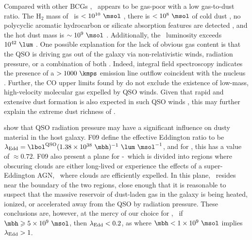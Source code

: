 \documentclass[useAMS,usenatbib]{mn2e}
\begin{document}
Compared with other BCGs \citep[\eg][]{edge01}, \irs\ appears to be
gas-poor with a low gas-to-dust ratio. The H$_2$ mass of \irs\ is $<
10^{10} ~\msol$ \citep{1998ApJ...506..205E}, there is $< 10^8 ~\msol$
of cold dust \citep{2001MNRAS.326.1467D}, no polycyclic aromatic
hydrocarbon or silicate absorption features are detected
\citep{2004ApJ...613..986P, 2008ApJ...683..114S}, and the hot dust
mass is $\sim 10^9 ~\msol$ \citep{1997A&A...318L...1T}. Additionally,
the \halpha\ luminosity exceeds $10^{42} ~\lum$
\citep{1996MNRAS.283.1003C, 1998ApJ...506..205E}. One possible
explanation for the lack of obvious gas content is that the QSO is
driving gas out of the galaxy via non-relativistic winds, radiation
pressure, or a combination of both
\citep[\eg][]{2010MNRAS.401....7H}. Indeed, integral field
spectroscopy indicates the presence of a $> 1000 ~\kmps$ emission line
outflow coincident with the nucleus
\citep{1996MNRAS.283.1003C}. Further, the CO upper limits found by
\citet{1998ApJ...506..205E} do not exclude the existence of low-mass,
high-velocity molecular gas expelled by QSO winds. Given that rapid
and extensive dust formation is also expected in such QSO winds
\citep{2002ApJ...567L.107E}, this may further explain the extreme dust
richness of \irs.

\citet[][hereafter F09]{2009MNRAS.394L..89F} show that QSO radiation
pressure may have a significant influence on dusty material in the
host galaxy. F09 define the effective Eddington ratio to be $\leff =
\lqso (1.38 \times 10^{38} ~\mbh)^{-1} ~\lum ~\msol^{-1}$, and for
\irs, this has a value of $\approx 0.72$. F09 also present a plane for
\nhobs-\leff\ which is divided into regions where obscuring clouds are
either long-lived or experience the effects of a super-Eddington AGN,
\ie\ where clouds are efficiently expelled. In this plane,
\irs\ resides near the boundary of the two regions, close enough that
it is reasonable to suspect that the massive reservoir of dust-laden
gas in the galaxy is being heated, ionized, or accelerated away from
the QSO by radiation pressure. These conclusions are, however, at the
mercy of our choice for \mbh, \ie\ if $\mbh \ge 5 \times 10^9 ~\msol$,
then $\lambda_{\mathrm{Edd}} < 0.2$, as where $\mbh < 1 \times 10^9 ~\msol$ implies
$\lambda_{\mathrm{Edd}} > 1$.
\end{document}
